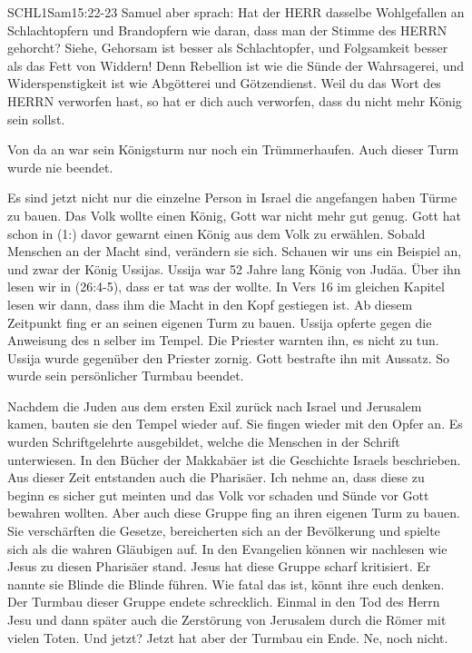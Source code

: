 \documentclass[14pt]{../../inc/mybib}
\begin{document}
    \begin{bibelbox}{SCHL}{1Sam}{15:22-23}
        Samuel aber sprach: Hat der HERR dasselbe Wohlgefallen an Schlachtopfern und Brandopfern wie daran, dass man der Stimme des HERRN gehorcht? Siehe, Gehorsam ist besser als Schlachtopfer, und Folgsamkeit besser als das Fett von Widdern! Denn Rebellion ist wie die Sünde der Wahrsagerei, und Widerspenstigkeit ist wie Abgötterei und Götzendienst. Weil du das Wort des HERRN verworfen hast, so hat er dich auch verworfen, dass du nicht mehr König sein sollst.
    \end{bibelbox} 
    Von da an war sein Königsturm nur noch ein Trümmerhaufen. Auch dieser Turm wurde nie beendet.

    Es sind jetzt nicht nur die einzelne Person in Israel die angefangen haben Türme zu bauen. Das Volk wollte einen König, Gott war nicht mehr gut genug. Gott hat schon in (1:) davor gewarnt einen König aus dem Volk zu erwählen. Sobald Menschen an der Macht sind, verändern sie sich. Schauen wir uns ein Beispiel an, und zwar der König Ussijas. Ussija war 52 Jahre lang König von Judäa. Über ihn lesen wir in (26:4-5), dass er tat was der \herr{} wollte. In Vers 16 im gleichen Kapitel lesen wir dann, dass ihm die Macht in den Kopf gestiegen ist. Ab diesem Zeitpunkt fing er an seinen eigenen Turm zu bauen. Ussija opferte gegen die Anweisung des \herr n selber im Tempel. Die Priester warnten ihn, es nicht zu tun. Ussija wurde gegenüber den Priester zornig. Gott bestrafte ihn mit Aussatz. So wurde sein persönlicher Turmbau beendet.

    Nachdem die Juden aus dem ersten Exil zurück nach Israel und Jerusalem kamen, bauten sie den Tempel wieder auf. Sie fingen wieder mit den Opfer an. Es wurden Schriftgelehrte ausgebildet, welche die Menschen in der Schrift unterwiesen. In den Bücher der Makkabäer ist die Geschichte Israels beschrieben. Aus dieser Zeit entstanden auch die Pharisäer. Ich nehme an, dass diese zu beginn es sicher gut meinten und das Volk vor schaden und Sünde vor Gott bewahren wollten. Aber auch diese Gruppe fing an ihren eigenen Turm zu bauen. Sie verschärften die Gesetze, bereicherten sich an der Bevölkerung und spielte sich als die wahren Gläubigen auf. In den Evangelien können wir nachlesen wie Jesus zu diesen Pharisäer stand. Jesus hat diese Gruppe scharf kritisiert. Er nannte sie Blinde die Blinde führen.  Wie fatal das ist, könnt ihre euch denken. Der Turmbau dieser Gruppe endete schrecklich. Einmal in den Tod des Herrn Jesu und dann später auch die Zerstörung von Jerusalem durch die Römer mit vielen Toten. Und jetzt? Jetzt hat aber der Turmbau ein Ende. Ne, noch nicht.
\end{document}
